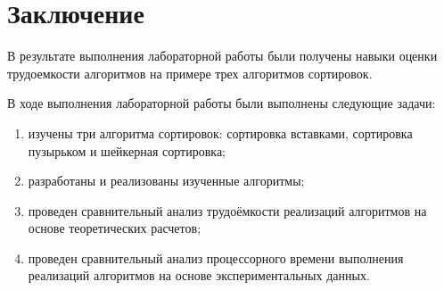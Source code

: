 \chapter*{Заключение}

В результате выполнения лабораторной работы были получены навыки оценки трудоемкости алгоритмов на примере трех алгоритмов сортировок.

В ходе выполнения лабораторной работы были выполнены следующие задачи: 
\begin{enumerate}[label={\arabic*)}]
	\item изучены три алгоритма сортировок: сортировка вставками, сортировка пузырьком и шейкерная сортировка;
	\item разработаны и реализованы изученные алгоритмы;
	\item проведен сравнительный анализ трудоёмкости реализаций алгоритмов на основе теоретических расчетов;
	\item проведен сравнительный анализ процессорного времени выполнения реализаций алгоритмов на основе экспериментальных данных.
\end{enumerate}


